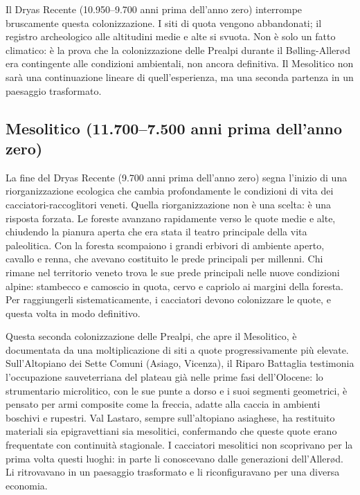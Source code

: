 Il Dryas Recente (10.950--9.700 anni prima dell'anno zero) interrompe bruscamente questa colonizzazione. I siti di quota vengono abbandonati; il registro archeologico alle altitudini medie e alte si svuota. Non è solo un fatto climatico: è la prova che la colonizzazione delle Prealpi durante il Bølling-Allerød era contingente alle condizioni ambientali, non ancora definitiva. Il Mesolitico non sarà una continuazione lineare di quell'esperienza, ma una seconda partenza in un paesaggio trasformato.

\subsection{Mesolitico (11.700--7.500 anni prima dell'anno zero)}

La fine del Dryas Recente (9.700 anni prima dell'anno zero) segna l'inizio di una riorganizzazione ecologica che cambia profondamente le condizioni di vita dei cacciatori-raccoglitori veneti. Quella riorganizzazione non è una scelta: è una risposta forzata. Le foreste avanzano rapidamente verso le quote medie e alte, chiudendo la pianura aperta che era stata il teatro principale della vita paleolitica. Con la foresta scompaiono i grandi erbivori di ambiente aperto, cavallo e renna, che avevano costituito le prede principali per millenni. Chi rimane nel territorio veneto trova le sue prede principali nelle nuove condizioni alpine: stambecco e camoscio in quota, cervo e capriolo ai margini della foresta. Per raggiungerli sistematicamente, i cacciatori devono colonizzare le quote, e questa volta in modo definitivo.

Questa seconda colonizzazione delle Prealpi, che apre il Mesolitico, è documentata da una moltiplicazione di siti a quote progressivamente più elevate. Sull'Altopiano dei Sette Comuni (Asiago, Vicenza), il Riparo Battaglia testimonia l'occupazione sauveterriana del plateau già nelle prime fasi dell'Olocene: lo strumentario microlitico, con le sue punte a dorso e i suoi segmenti geometrici, è pensato per armi composite come la freccia, adatte alla caccia in ambienti boschivi e rupestri. Val Lastaro, sempre sull'altopiano asiaghese, ha restituito materiali sia epigravettiani sia mesolitici, confermando che queste quote erano frequentate con continuità stagionale. I cacciatori mesolitici non scoprivano per la prima volta questi luoghi: in parte li conoscevano dalle generazioni dell'Allerød. Li ritrovavano in un paesaggio trasformato e li riconfiguravano per una diversa economia.

